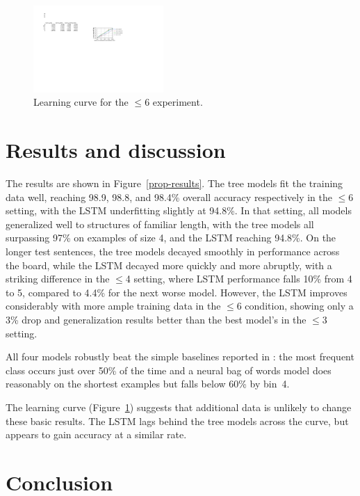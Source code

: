 \begin{figure}[t]
  \centering
      \includegraphics[height=1.3in]{lc.pdf}
  \caption{Learning curve for the $\le$6 experiment.}
  \label{fig:lc} 
\end{figure}

\section{Results and discussion}\label{sec:discussion}

The results are shown in Figure~\ref{prop-results}. 
The tree models fit the training data well, reaching 98.9, 98.8, and 98.4\% overall accuracy respectively in the $\le$6 setting, with the LSTM underfitting slightly at 94.8\%. 
In that setting, all models generalized well to structures of familiar length, with the tree models all surpassing 97\% on examples of size 4, and the LSTM reaching 94.8\%.
On the longer test sentences, the tree models decayed smoothly in performance across the board, while the LSTM decayed more quickly and more abruptly, with a striking difference in the $\le$4 setting, where LSTM performance falls 10\% from 4 to 5, compared to 4.4\% for the next worse model. However, the LSTM improves considerably with more ample training data in the $\le$6 condition, showing only a 3\% drop and generalization results better than the best model's in the $\le$3 setting.

All four models robustly beat the simple baselines reported in : the most frequent class occurs just over 50\% of the time and a neural bag of words model does reasonably on the shortest examples but falls below 60\% by bin~4.

The learning curve (Figure~\ref{fig:lc}) suggests that additional data is unlikely to change these basic results. The LSTM lags behind the tree models across the curve, but appears to gain accuracy at a similar rate.

\section{Conclusion}


